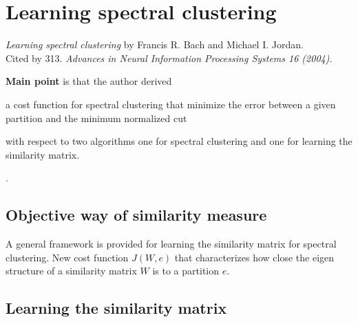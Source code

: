 \section{Learning spectral clustering}
\label{ch:jordan04}

\textit{Learning spectral clustering} by Francis R. Bach and Michael I. Jordan. \\
Cited by 313. \textit{Advances in Neural Information Processing Systems 16 (2004)}.
\newline

\textbf{Main point} is that the author derived \begin{inparaenum}
\item a cost function for spectral clustering that minimize the error between a given partition and the minimum normalized cut
\item with respect to two algorithms one for spectral clustering and one for learning the similarity matrix.
\end{inparaenum}.

\subsection{Objective way of similarity measure}
A general framework is provided for learning the similarity matrix for spectral clustering. New cost function $J(W,e)$ that characterizes how close the eigen structure of a similarity matrix $W$ is to a partition $e$. 
%

\subsection{Learning the similarity matrix}

